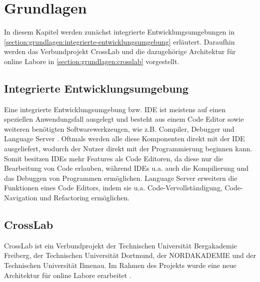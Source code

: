 \chapter{Grundlagen}\label{section:grundlagen}

In diesem Kapitel werden zunächst integrierte Entwicklungsumgebungen in \autoref{section:grundlagen:integrierte-entwicklungsumgebung} erläutert. Daraufhin werden das Verbundprojekt CrossLab und die dazugehörige Architektur für online Labore in \autoref{section:grundlagen:crosslab} vorgestellt.

\section{Integrierte Entwicklungsumgebung}\label{section:grundlagen:integrierte-entwicklungsumgebung}
Eine integrierte Entwicklungsumgebung bzw. \ac{IDE} ist meistens auf einen speziellen Anwendungsfall ausgelegt und besteht aus einem Code Editor sowie weiteren benötigten Softwarewerkzeugen, wie z.B. Compiler, Debugger und Language Server \cite{noauthor_language-server-protocol_nodate}. Oftmals werden alle diese Komponenten direkt mit der \ac{IDE} ausgeliefert, wodurch der Nutzer direkt mit der Programmierung beginnen kann. Somit besitzen \acp{IDE} mehr Features als Code Editoren, da diese nur die Bearbeitung von Code erlauben, während \acp{IDE} u.a. auch die Kompilierung und das Debuggen von Programmen ermöglichen. Language Server erweitern die Funktionen eines Code Editors, indem sie u.a. Code-Vervollständigung, Code-Navigation und Refactoring ermöglichen.

\section{CrossLab}\label{section:grundlagen:crosslab}
CrossLab \cite{aubel_adaptable_2022} ist ein Verbundprojekt der Technischen Universität Bergakademie Freiberg, der Technischen Universität Dortmund, der NORDAKADEMIE und der Technischen Universität Ilmenau. Im Rahmen des Projekts wurde eine neue Architektur für online Labore erarbeitet \cite{nau_new_2022}.

